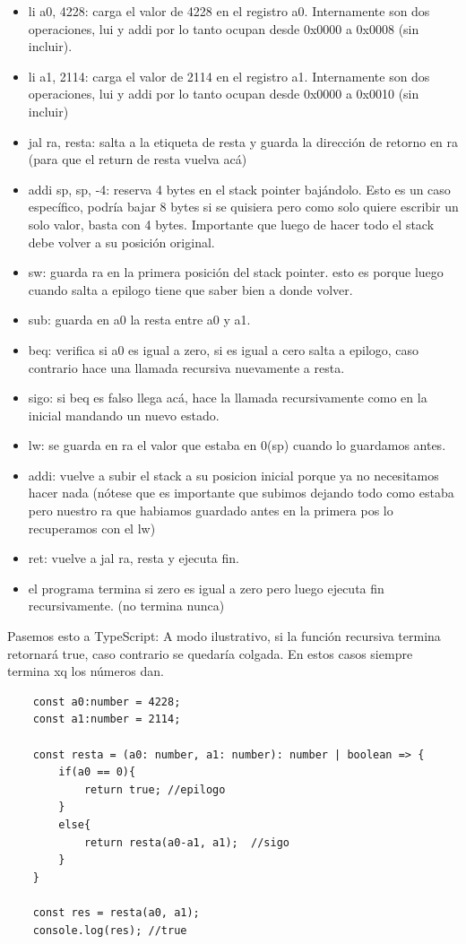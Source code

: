 \documentclass[10pt,a4paper]{article}
\begin{document}
\begin{itemize}
    \item li a0, 4228: carga el valor de 4228 en el registro a0. Internamente son dos operaciones, lui y addi por lo tanto ocupan desde 0x0000 a 0x0008 (sin incluir).
    \item li a1, 2114: carga el valor de 2114 en el registro a1. Internamente son dos operaciones, lui y addi por lo tanto ocupan desde 0x0000 a 0x0010 (sin incluir)
    \item jal ra, resta: salta a la etiqueta de resta y guarda la dirección de retorno en ra (para que el return de resta vuelva acá)
    \item addi sp, sp, -4: reserva 4 bytes en el stack pointer bajándolo. Esto es un caso específico, podría bajar 8 bytes si se quisiera pero como solo quiere escribir un solo valor, basta con 4 bytes. Importante que luego de hacer todo el stack debe volver a su posición original.
    \item sw: guarda ra en la primera posición del stack pointer. esto es porque luego cuando salta a epilogo tiene que saber bien a donde volver.
    \item sub: guarda en a0 la resta entre a0 y a1.
    \item beq: verifica si a0 es igual a zero, si es igual a cero salta a epilogo, caso contrario hace una llamada recursiva nuevamente a resta.
    \item sigo: si beq es falso llega acá, hace la llamada recursivamente como en la inicial mandando un nuevo estado.
    \item lw: se guarda en ra el valor que estaba en 0(sp) cuando lo guardamos antes.
    \item addi: vuelve a subir el stack a su posicion inicial porque ya no necesitamos hacer nada (nótese que es importante que subimos dejando todo como estaba pero nuestro ra que habiamos guardado antes en la primera pos lo recuperamos con el lw)
    \item ret: vuelve a jal ra, resta y ejecuta fin.
    \item el programa termina si zero es igual a zero pero luego ejecuta fin recursivamente. (no termina nunca)
\end{itemize}
Pasemos esto a TypeScript: A modo ilustrativo, si la función recursiva termina retornará true, caso contrario se quedaría colgada. En estos casos siempre termina xq los números dan.
\begin{lstlisting}
    const a0:number = 4228;
    const a1:number = 2114;

    const resta = (a0: number, a1: number): number | boolean => {
        if(a0 == 0){
            return true; //epilogo
        }
        else{
            return resta(a0-a1, a1);  //sigo
        }
    }

    const res = resta(a0, a1);
    console.log(res); //true
\end{lstlisting}
\end{document}
